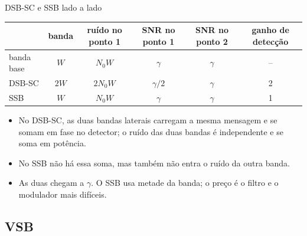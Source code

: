 
\begin{frame}{DSB-SC e SSB lado a lado}

\small
\begin{center}
\begin{tabular}{l c c c c c}
\toprule
 & banda & ruído no ponto 1 & SNR no ponto 1 & SNR no ponto 2 & ganho de detecção \\
\midrule
banda base & $W$ & $N_0W$ & $\gamma$ & $\gamma$ & -- \\
\pause
DSB-SC & $2W$ & $2N_0W$ & $\gamma/2$ & $\gamma$ & 2 \\
\pause
SSB & $W$ & $N_0W$ & $\gamma$ & $\gamma$ & 1 \\
\bottomrule
\end{tabular}
\end{center}

\begin{itemize}
\item<4-> No DSB-SC, as duas bandas laterais carregam a mesma mensagem e se somam em fase no detector; o ruído das duas bandas é independente e se soma em potência.
\item<5-> No SSB não há essa soma, mas também não entra o ruído da outra banda.
\item<6-> As duas chegam a $\gamma$. O SSB usa metade da banda; o preço é o filtro e o modulador mais difíceis.
\end{itemize}

\end{frame}


\subsection{VSB}

